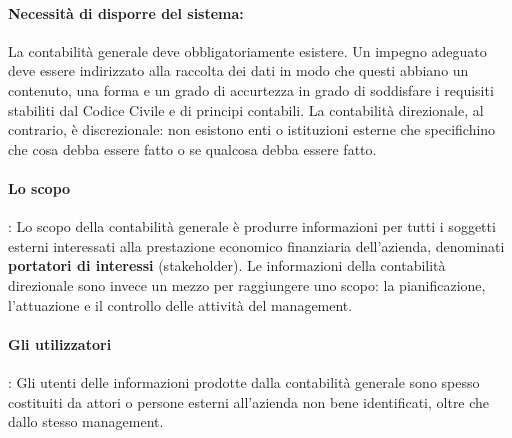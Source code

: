\documentclass{article}
\begin{document}
\paragraph{Necessità di disporre del sistema:} La contabilità generale deve obbligatoriamente esistere. Un impegno adeguato deve essere indirizzato alla raccolta dei dati in modo che questi abbiano un contenuto, una forma e un grado di accurtezza in grado di soddisfare i requisiti stabiliti dal Codice Civile e di principi contabili. La contabilità direzionale, al contrario, è discrezionale: non esistono enti o istituzioni esterne che specifichino che cosa debba essere fatto o se qualcosa debba essere fatto.
\paragraph{Lo scopo}: Lo scopo della contabilità generale è produrre informazioni per tutti i soggetti esterni interessati alla prestazione economico finanziaria dell'azienda, denominati \textbf{portatori di interessi} (stakeholder). Le informazioni della contabilità direzionale sono invece un mezzo per raggiungere uno scopo: la pianificazione, l'attuazione e il controllo delle attività del management.
\paragraph{Gli utilizzatori}: Gli utenti delle informazioni prodotte dalla contabilità generale sono spesso costituiti da attori o persone esterni all'azienda non bene identificati, oltre che dallo stesso management.
\paragraph{}
\end{document}

